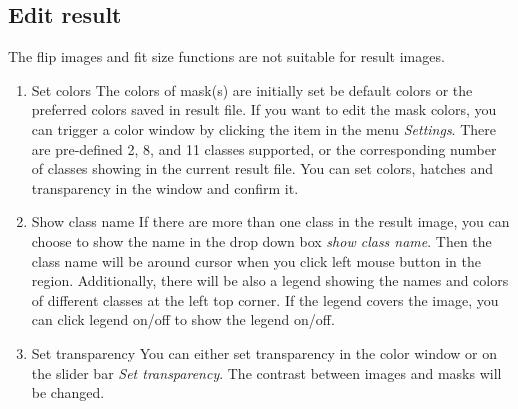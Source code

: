 \documentclass[12pt]{article}
\begin{document}
\subsection{Edit result}
The flip images and fit size functions are not suitable for result images. 
\begin{enumerate}
	
	\item Set colors
	\newline The colors of mask(s) are initially set be default colors or the preferred colors saved in result file. If you want to edit the mask colors, you can trigger a color window by clicking the item in the menu \textit{Settings}. There are pre-defined 2, 8, and 11 classes supported, or the corresponding number of classes showing in the current result file. You can set colors, hatches and transparency in the window and confirm it.
	\item Show class name
	\newline If there are more than one class in the result image, you can choose to show the name in the drop down box \textit{show class name}. Then the class name will be around cursor when you click left mouse button in the region. Additionally, there will be also a legend showing the names and colors of different classes at the left top corner. If the legend covers the image, you can click legend on/off to show the legend on/off.
	\item Set transparency
	You can either set transparency in the color window or on the slider bar \textit{Set transparency}. The contrast between images and masks will be changed.
\end{enumerate}
\end{document}
